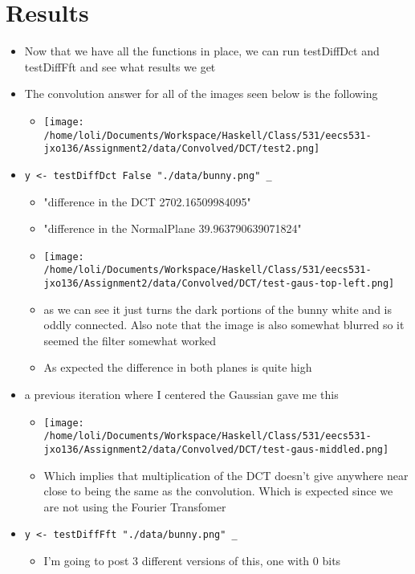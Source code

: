 \documentclass{article}
\begin{document}
\section{Results}
\label{sec-3}
\begin{itemize}
\item Now that we have all the functions in place, we can run testDiffDct
and testDiffFft and see what results we get
\item The convolution answer for all of the images seen below is the
following
\begin{itemize}
\item \texttt{[image: /home/loli/Documents/Workspace/Haskell/Class/531/eecs531-jxo136/Assignment2/data/Convolved/DCT/test2.png]}
\end{itemize}
\item \texttt{y <- testDiffDct False "./data/bunny.png" \_} \\
\begin{itemize}
\item "difference in the DCT 2702.16509984095"
\item "difference in the NormalPlane 39.963790639071824"
\item \texttt{[image: /home/loli/Documents/Workspace/Haskell/Class/531/eecs531-jxo136/Assignment2/data/Convolved/DCT/test-gaus-top-left.png]}
\item as we can see it just turns the dark portions of the bunny white and
is oddly connected. Also note that the image is also somewhat
blurred so it seemed the filter somewhat worked
\item As expected the difference in both planes is quite high
\end{itemize}
\item a previous iteration where Ι centered the Gaussian gave me this
\begin{itemize}
\item \texttt{[image: /home/loli/Documents/Workspace/Haskell/Class/531/eecs531-jxo136/Assignment2/data/Convolved/DCT/test-gaus-middled.png]}
\item Which implies that multiplication of the DCT doesn't give anywhere
near close to being the same as the convolution. Which is expected
since we are not using the Fourier Transfomer
\end{itemize}
\item \texttt{y <- testDiffFft "./data/bunny.png" \_}
\begin{itemize}
\item I'm going to post 3 different versions of this, one with 0 bits

\end{itemize}
\end{itemize}
\end{document}
